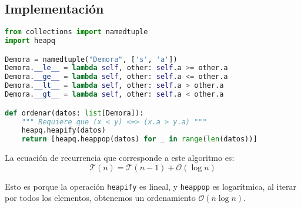 \subsection{Implementaci\'on}

\begin{lstlisting}[language=Python]
from collections import namedtuple
import heapq

Demora = namedtuple("Demora", ['s', 'a'])
Demora.__le__ = lambda self, other: self.a >= other.a
Demora.__ge__ = lambda self, other: self.a <= other.a
Demora.__lt__ = lambda self, other: self.a > other.a
Demora.__gt__ = lambda self, other: self.a < other.a

def ordenar(datos: list[Demora]):
    """ Requiere que (x < y) <=> (x.a > y.a) """
    heapq.heapify(datos)
    return [heapq.heappop(datos) for _ in range(len(datos))]
\end{lstlisting}

La ecuaci\'on de recurrencia que corresponde a este algoritmo es: 
\begin{equation*} %
    \mathcal{T}(n) = \mathcal{T}\left(n - 1\right) + \mathcal{O}\left(\log n\right)
\end{equation*}

Esto es porque la operaci\'on \texttt{heapify} es lineal, y \texttt{heappop} es logar\'itmica, al iterar por todos los elementos, obtenemos un ordenamiento $\mathcal{O}\left(n \log n\right)$.
